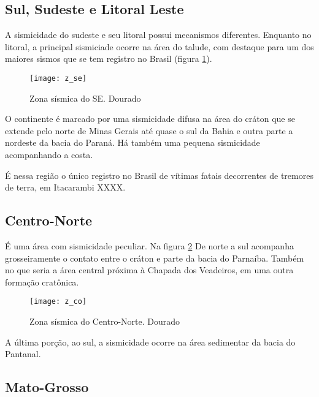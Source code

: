 \subsection{Sul, Sudeste e Litoral Leste}
\label{sec:z_se}

A sismicidade do sudeste e seu litoral possui mecanismos diferentes.
Enquanto no litoral, a principal sismiciade ocorre na área do talude, com
destaque para um dos maiores sismos que se tem registro no Brasil (figura \ref{fig:z_se}).

\begin{figure}[H]
  \centering
  \texttt{[image: z\_se]} 
  \caption{Zona sísmica do SE. Dourado}
  \label{fig:z_se} 
\end{figure}

O continente é marcado por uma sismicidade difusa na área do cráton que se extende pelo norte de Minas
Gerais até quase o sul da Bahia e outra parte a nordeste da bacia do Paraná. 
Há também uma pequena sismicidade acompanhando a costa.

É nessa região o único registro no Brasil de vítimas fatais decorrentes de tremores de terra, em Itacarambi XXXX.

\subsection{Centro-Norte}
\label{sec:z_cn}

É uma área com sismicidade peculiar. Na figura \ref{fig:z_cn} De norte a sul acompanha grosseiramente o
contato entre o cráton e parte da bacia do Parnaíba. Também no que seria a 
área central próxima à Chapada dos Veadeiros, em uma outra formação cratônica.

\begin{figure}[H]
  \centering
  \texttt{[image: z\_co]} 
  \caption{Zona sísmica do Centro-Norte. Dourado}
  \label{fig:z_cn} 
\end{figure}

A última porção, ao sul, a sismicidade ocorre na área sedimentar da bacia do Pantanal.

\subsection{Mato-Grosso}
\label{sec:z_mt}

